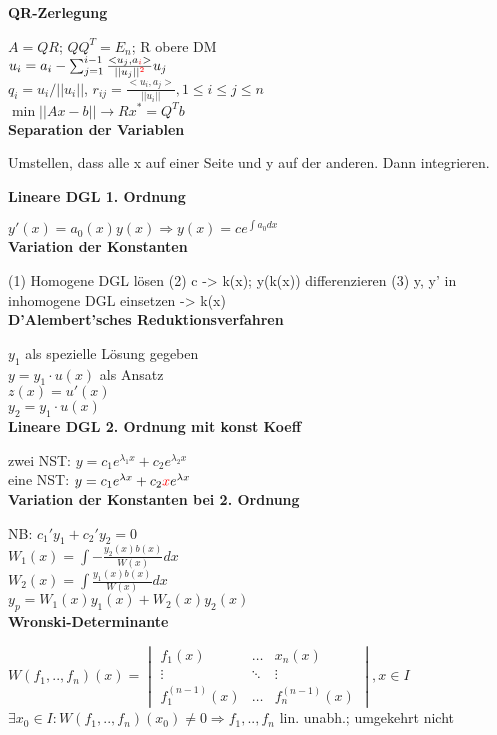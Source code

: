 \documentclass[10pt,twocolumn,a4paper]{article}
\begin{document}
\begin{flushleft}
\textbf{QR-Zerlegung}

$A = QR$; $QQ^T = E_n$; R obere DM\\
$u_i = a_i - \sum_{j=1}^{i-1} \frac{<u_j, a_{\textcolor{red}{i}}>}{||u_j||^{\textcolor{red}{2}}}u_j$\\
$q_i = u_i / ||u_i||$, $r_{ij} = \frac{<u_i, a_j>}{||u_i||}, 1 \leq i \leq j \leq n$\\
$\min ||Ax-b|| \rightarrow Rx^* = Q^T b$\\

\textbf{Separation der Variablen}

Umstellen, dass alle x auf einer Seite und y auf der anderen. Dann integrieren.

\textbf{Lineare DGL 1. Ordnung}

$y'(x)=a_0(x)y(x) \Rightarrow y(x) = ce^{\int{a_0}dx}$\\

\textbf{Variation der Konstanten}

(1) Homogene DGL lösen (2) c -> k(x); y(k(x)) differenzieren (3) y, y' in inhomogene DGL einsetzen -> k(x)\\

\textbf{D'Alembert'sches Reduktionsverfahren}

$y_1$ als spezielle Lösung gegeben\\
$y=y_1 \cdot u(x)$ als Ansatz\\
$z(x) = u'(x)$\\
$y_2 = y_1 \cdot u(x)$\\

\textbf{Lineare DGL 2. Ordnung mit konst Koeff}

zwei NST: $y = c_1 e^{\lambda_1 x} + c_2 e^{\lambda_2 x}$\\
eine NST: $y = c_1 e^{\lambda x} + c_2 \textcolor{red}{x} e^{\lambda x}$\\

\textbf{Variation der Konstanten bei 2. Ordnung}

NB: $c_1'y_1 + c_2'y_2 = 0$\\
$W_1(x) = \int - \frac{y_2(x)b(x)}{W(x)} dx$\\
$W_2(x) = \int \frac{y_1(x) b(x)}{W(x)} dx$\\
$y_p = W_1(x)y_1(x) + W_2(x)y_2(x)$\\

\textbf{Wronski-Determinante}

$ W(f_1,..,f_n)(x) =
\begin{vmatrix}
    f_{1}(x) & \dots  & x_{n}(x) \\
    \vdots & \ddots & \vdots \\
    f_{1}^{(n-1)}(x) & \dots & f_n^{(n-1)}(x)
\end{vmatrix}, x \in I
$\\
$\exists x_0 \in I: W(f_1,..,f_n)(x_0) \neq 0 \Rightarrow f_1,..,f_n$ lin. unabh.; umgekehrt nicht\\


\end{flushleft}
\end{document}
